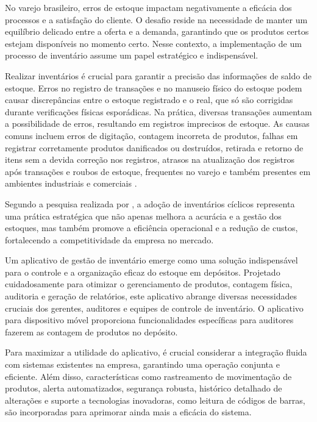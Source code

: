 
No varejo brasileiro, erros de estoque impactam negativamente a eficácia dos processos e a satisfação do cliente.
O desafio reside na necessidade de manter um equilíbrio delicado entre a oferta e a demanda, garantindo que os produtos certos estejam disponíveis no momento certo. Nesse contexto, a implementação de um processo de inventário assume um papel estratégico e indispensável.


Realizar inventários é crucial para garantir a precisão das informações de saldo de estoque. Erros no registro de transações e no manuseio físico do estoque podem causar discrepâncias entre o estoque registrado e o real, que só são corrigidas durante verificações físicas esporádicas. Na prática, diversas transações aumentam a possibilidade de erros, resultando em registros imprecisos de estoque. As causas comuns incluem erros de digitação, contagem incorreta de produtos, falhas em registrar corretamente produtos danificados ou destruídos, retirada e retorno de itens sem a devida correção nos registros, atrasos na atualização dos registros após transações e roubos de estoque, frequentes no varejo e também presentes em ambientes industriais e comerciais \cite{nigel}.

Segundo a pesquisa realizada por \cite{silva}, a adoção de inventários cíclicos representa uma prática estratégica que não apenas melhora a acurácia e a gestão dos estoques, mas também promove a eficiência operacional e a redução de custos, fortalecendo a competitividade da empresa no mercado.


Um aplicativo de gestão de inventário emerge como uma solução indispensável para o controle e a organização eficaz do estoque em depósitos. Projetado cuidadosamente para otimizar o gerenciamento de produtos, contagem física, auditoria e geração de relatórios, este aplicativo abrange diversas necessidades cruciais dos gerentes, auditores e equipes de controle de inventário. O aplicativo para dispositivo móvel proporciona funcionalidades específicas para auditores fazerem as contagem de produtos no depósito.

Para maximizar a utilidade do aplicativo, é crucial considerar a integração fluida com sistemas existentes na empresa, garantindo uma operação conjunta e eficiente. Além disso, características como rastreamento de movimentação de produtos, alerta automatizados, segurança robusta, histórico detalhado de alterações e suporte a tecnologias inovadoras, como leitura de códigos de barras, são incorporadas para aprimorar ainda mais a eficácia do sistema.

